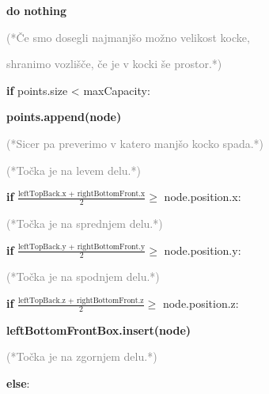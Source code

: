\documentclass[fleqn]{article}
\begin{document}
\hspace{2cm} \textbf{do nothing}

\vspace{3mm}
\hspace{1cm} \textcolor{gray}{(*Če smo dosegli najmanjšo možno velikost kocke,} 

\hspace{1cm} \textcolor{gray}{shranimo vozlišče, če je v kocki še prostor.*)} 

\hspace{1cm}  \textbf{if} points.size < maxCapacity:

\hspace{2cm} \textbf{points.append(node)}

\vspace{3mm}
\hspace{1cm} \textcolor{gray}{(*Sicer pa preverimo v katero manjšo kocko spada.*)} 

\vspace{2mm}
\hspace{1cm} \textcolor{gray}{(*Točka je na levem delu.*)} 

\vspace{2mm}
\hspace{1cm}  \textbf{if} $\frac{\text{leftTopBack.x + rightBottomFront.x}}{2} \geq$ node.position.x:

\vspace{2mm}
\hspace{2cm} \textcolor{gray}{(*Točka je na sprednjem delu.*)} 

\vspace{2mm}
\hspace{2cm}  \textbf{if} $\frac{\text{leftTopBack.y + rightBottomFront.y}}{2} \geq$ node.position.y:

\vspace{2mm}
\hspace{3cm} \textcolor{gray}{(*Točka je na spodnjem delu.*)} 

\vspace{2mm}
\hspace{3cm}  \textbf{if} $\frac{\text{leftTopBack.z + rightBottomFront.z}}{2} \geq$ node.position.z:

\hspace{4cm} \textbf{leftBottomFrontBox.insert(node)}

\vspace{2mm}
\hspace{3cm} \textcolor{gray}{(*Točka je na zgornjem delu.*)} 

\vspace{2mm}
\hspace{3cm}  \textbf{else}: 
\end{document}
